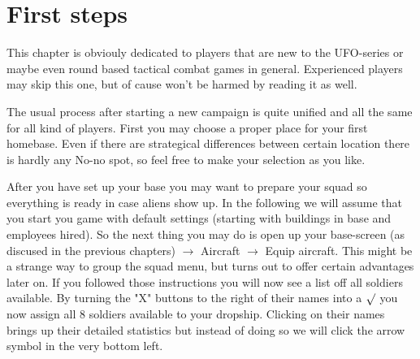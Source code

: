 

%
%

\section{First steps}
This chapter is obviouly dedicated to players that are new to the UFO-series or maybe even round based tactical combat games in general. Experienced players may skip this one, but of cause won't be harmed by reading it as well.

The usual process after starting a new campaign is quite unified and all the same for all kind of players. First you may choose a proper place for your first homebase. Even if there are strategical differences between certain location there is hardly any No-no spot, so feel free to make your selection as you like.

After you have set up your base you may want to prepare your squad so everything is ready in case aliens show up. In the following we will assume that you start you game with default settings (starting with buildings in base and employees hired). So the next thing you may do is open up your base-screen (as discused in the previous chapters) $\rightarrow$ Aircraft $\rightarrow$ Equip aircraft. This might be a strange way to group the squad menu, but turns out to offer certain advantages later on. If you followed those instructions you will now see a list off all soldiers available. By turning the "X" buttons to the right of their names into a $\surd$ you now assign all 8 soldiers available to your dropship. Clicking on their names brings up their detailed statistics but instead of doing so we will click the arrow symbol in the very bottom left.

